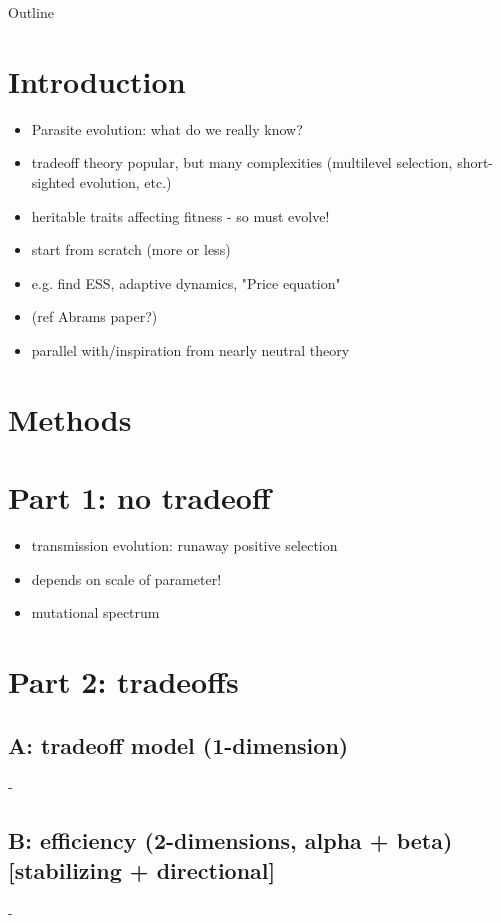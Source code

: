 Outline

\section*{Introduction}

\begin{itemize}
    \item Parasite evolution: what do we really know?
    \item tradeoff theory popular, but many complexities (multilevel selection, short-sighted evolution, etc.)
    \item heritable traits affecting fitness - so must evolve!
    \item start from scratch (more or less)
    \item e.g. find ESS, adaptive dynamics, "Price equation"
    \item (ref Abrams paper?)
    \item parallel with/inspiration from nearly neutral theory
\end{itemize}

\section*{Methods}

\section*{Part 1: no tradeoff}

\begin{itemize}
    \item transmission evolution: runaway positive selection
    \item depends on scale of parameter!
    \item mutational spectrum
\end{itemize}

\section*{Part 2: tradeoffs}

\subsection*{A: tradeoff model (1-dimension)}
    - 
\subsection*{B: efficiency (2-dimensions, alpha + beta) [stabilizing + directional]}
    - 
